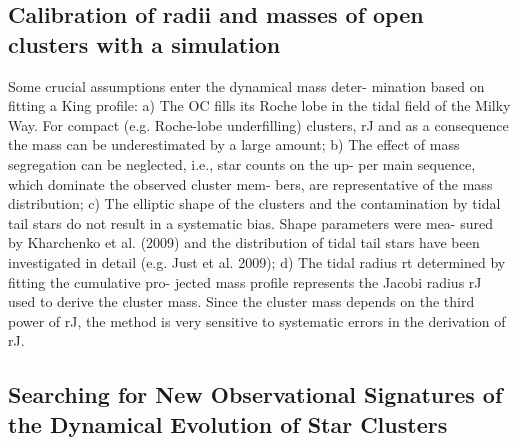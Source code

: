\documentclass[../main.tex]{subfiles}
\begin{document}
{\subsection{Calibration of radii and masses of open clusters with a simulation}


Some crucial assumptions enter the dynamical mass deter-
mination based on fitting a King profile: a) The OC fills its
Roche lobe in the tidal field of the Milky Way. For compact (e.g.
Roche-lobe underfilling) clusters, rJ and as a consequence the
mass can be underestimated by a large amount; b) The eﬀect of
mass segregation can be neglected, i.e., star counts on the up-
per main sequence, which dominate the observed cluster mem-
bers, are representative of the mass distribution; c) The elliptic
shape of the clusters and the contamination by tidal tail stars
do not result in a systematic bias. Shape parameters were mea-
sured by Kharchenko et al. (2009) and the distribution of tidal
tail stars have been investigated in detail (e.g. Just et al. 2009);
d) The tidal radius rt determined by fitting the cumulative pro-
jected mass profile represents the Jacobi radius rJ used to derive
the cluster mass. Since the cluster mass depends on the third
power of rJ, the method is very sensitive to systematic errors in
the derivation of rJ.

\subsection{Searching for New Observational Signatures of the Dynamical Evolution of Star Clusters}


}
\end{document}
